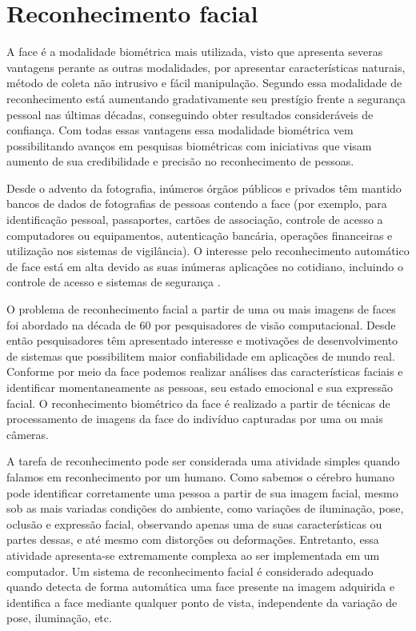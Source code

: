 \chapter{Reconhecimento facial}
\label{cp:3_rec_facial}

A face é a modalidade biométrica mais utilizada, visto que apresenta severas vantagens perante as outras modalidades, por apresentar características naturais, método de coleta não intrusivo e fácil manipulação. Segundo  essa modalidade de reconhecimento está aumentando gradativamente seu prestígio frente a segurança pessoal nas últimas décadas, conseguindo obter resultados consideráveis de confiança. Com todas essas vantagens essa modalidade biométrica vem possibilitando avanços em pesquisas biométricas com iniciativas que visam aumento de sua credibilidade e precisão no reconhecimento de pessoas.

Desde o advento da fotografia, inúmeros órgãos públicos e privados têm mantido bancos de dados de fotografias de pessoas contendo a face (por exemplo, para identificação pessoal, passaportes, cartões de associação, controle de acesso a computadores ou equipamentos, autenticação bancária, operações financeiras e utilização nos sistemas de vigilância). O interesse pelo reconhecimento automático de face está em alta devido as suas inúmeras aplicações no cotidiano, incluindo o controle de acesso e sistemas de segurança \cite{buciu2014challenges}. 


O problema de reconhecimento facial a partir de uma ou mais imagens de faces foi abordado na década de 60 por pesquisadores de visão computacional. Desde então pesquisadores têm apresentado interesse e motivações de desenvolvimento de sistemas que possibilitem maior confiabilidade em aplicações de mundo real. Conforme  por meio da face podemos realizar análises das características faciais e identificar momentaneamente as pessoas, seu estado emocional e sua expressão facial. O reconhecimento biométrico da face é realizado a partir de técnicas de processamento de imagens da face do indivíduo capturadas por uma ou mais câmeras. 

A tarefa de reconhecimento pode ser considerada uma atividade simples quando falamos em reconhecimento por um humano.  Como sabemos o cérebro humano pode identificar corretamente uma pessoa a partir de sua imagem facial, mesmo sob as mais variadas condições do ambiente, como variações de iluminação, pose, oclusão e expressão facial, observando apenas uma de suas características ou partes dessas, e até mesmo com distorções ou deformações. Entretanto, essa atividade apresenta-se extremamente complexa ao ser implementada em um computador. Um sistema de reconhecimento facial é considerado adequado quando detecta de forma automática uma face presente na imagem adquirida e identifica a face mediante qualquer ponto de vista, independente da variação de pose, iluminação, etc.

